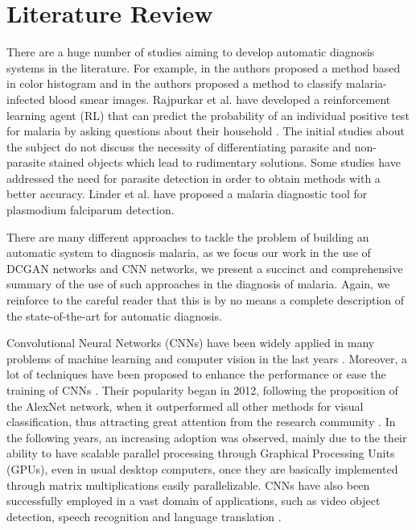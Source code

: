 \section{Literature Review}

There are a huge number of studies aiming to develop automatic diagnosis systems in the literature. For example, in \cite{tek2006malaria} the authors proposed a method based in color histogram and in \cite{Diaz2009} the authors proposed a method to classify malaria-infected blood smear images. Rajpurkar et al. have developed a reinforcement learning agent (RL) that can predict the probability of an individual positive test for malaria by asking questions about their household \cite{Rajpurkar2017}. The initial studies about the subject do not discuss the necessity of differentiating parasite and non-parasite stained objects which lead to rudimentary solutions. Some studies have addressed the need for parasite detection in order to obtain methods with a better accuracy. Linder et al. \cite{linder2014malaria} have proposed a malaria diagnostic tool for plasmodium falciparum detection. 

There are many different approaches to tackle the problem of building an automatic system to diagnosis malaria, as we focus our work in the use of DCGAN networks and CNN networks, we present a succinct and comprehensive summary of the use of such approaches in the diagnosis of malaria. Again, we reinforce to the careful reader that this is by no means a complete description of the state-of-the-art for automatic diagnosis. 

Convolutional Neural Networks (CNNs) have been  widely applied in many problems of machine learning and computer vision in the last years \cite{krizhevsky2012imagenet,szegedy2015going}. Moreover, a lot of techniques have been proposed to enhance the performance or ease the training of CNNs \cite{simonyan2014very,srivastava2014dropout}. Their popularity began in 2012, following the proposition of the AlexNet network, when it outperformed all other methods for visual classification, thus attracting great attention from the research community \cite{Krizhevsky:2012:ICD:2999134.2999257}. In the following years, an increasing adoption was observed, mainly due to the their ability to have scalable parallel processing through Graphical Processing Units (GPUs), even in usual desktop computers, once they are basically implemented through matrix multiplications easily parallelizable. CNNs have also been successfully employed in a vast domain of applications, such as video object detection, speech recognition and language translation \cite{liu2017survey}.

